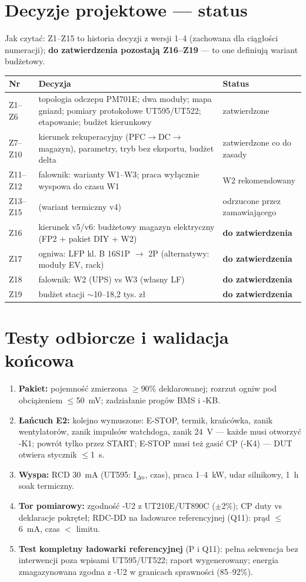 \documentclass[11pt,a4paper]{article}
\begin{document}
\section{Decyzje projektowe --- status}
Jak czytać: Z1--Z15 to historia decyzji z wersji 1--4 (zachowana dla ciągłości numeracji);
\textbf{do zatwierdzenia pozostają Z16--Z19} --- to one definiują wariant budżetowy.
\begin{longtable}{@{}p{}p{}p{}@{}}
\toprule
\textbf{Nr} & \textbf{Decyzja} & \textbf{Status}\\
\midrule
Z1--Z6 & topologia odczepu PM701E; dwa moduły; mapa gniazd; pomiary protokołowe UT595/UT522;
etapowanie; budżet kierunkowy & zatwierdzone\\
Z7--Z10 & kierunek rekuperacyjny (PFC$\to$DC$\to$magazyn), parametry, tryb bez eksportu, budżet delta & zatwierdzone co do zasady\\
Z11--Z12 & falownik: warianty W1--W3; praca wyłącznie wyspowa do czasu W1 & W2 rekomendowany\\
Z13--Z15 & (wariant termiczny v4) & odrzucone przez zamawiającego\\
Z16 & kierunek v5/v6: budżetowy magazyn elektryczny (FP2 + pakiet DIY + W2) & \textbf{do zatwierdzenia}\\
Z17 & ogniwa: LFP kl. B 16S1P $\to$ 2P (alternatywy: moduły EV, rack) & \textbf{do zatwierdzenia}\\
Z18 & falownik: W2 (UPS) vs W3 (własny LF) & \textbf{do zatwierdzenia}\\
Z19 & budżet stacji $\sim$10--18,2 tys. zł & \textbf{do zatwierdzenia}\\
\bottomrule
\end{longtable}

\section{Testy odbiorcze i walidacja końcowa}
\begin{enumerate}
\item \textbf{Pakiet:} pojemność zmierzona $\ge$90\% deklarowanej; rozrzut ogniw pod obciążeniem
$\le$50~mV; zadziałanie progów BMS i -KB.
\item \textbf{Łańcuch E2:} kolejno wymuszone: E-STOP, termik, krańcówka, zanik wentylatorów,
zanik impulsów watchdoga, zanik 24~V --- każde musi otworzyć -K1; powrót tylko przez START;
E-STOP musi też gasić CP (-K4) --- DUT otwiera stycznik $\le$1~s.
\item \textbf{Wyspa:} RCD 30~mA (UT595: I$_{\Delta n}$, czas), praca 1--4~kW, udar silnikowy,
1~h soak termiczny.
\item \textbf{Tor pomiarowy:} zgodność -U2 z UT210E/UT890C ($\pm$2\%); CP duty vs deklaracje
pokręteł; RDC-DD na ładowarce referencyjnej (Q11): prąd $\le$6~mA, czas $<$ limitu.
\item \textbf{Test kompletny ładowarki referencyjnej} (P i Q11): pełna sekwencja bez interwencji
poza wpisami UT595/UT522; raport wygenerowany; energia zmagazynowana zgodna z -U2 w granicach
sprawności (85--92\%).
\end{enumerate}
\end{document}

